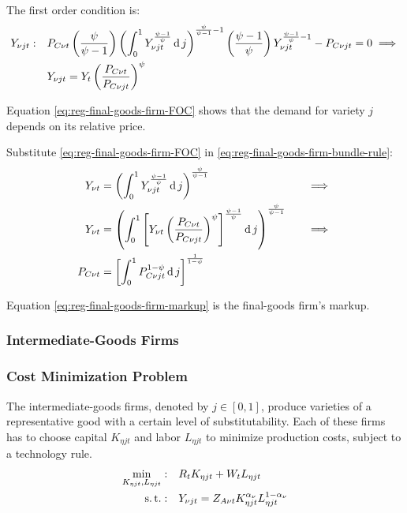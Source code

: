 \documentclass[
thesis.tex
]{subfiles}
\begin{document}
The first order condition is:
\begin{align}
	Y_{\nu jt}:\quad & P_{C\nu t} \left( \frac{\psi}{\psi-1} \right) \left( \int_{0}^{1} Y_{\nu jt}^{\frac{\psi-1}{\psi}} \operatorname{d} j \right)^{\frac{\psi}{\psi-1}-1} \left( \frac{\psi-1}{\psi} \right) Y_{\nu jt}^{\frac{\psi-1}{\psi}-1} - P_{C\nu jt} = 0 \implies \nonumber \\
	\label{eq:reg-final-goods-firm-FOC}
	& Y_{\nu jt} = Y_t \left( \frac{P_{C\nu t}}{P_{C\nu jt}} \right)^{\psi}
\end{align}

Equation \ref{eq:reg-final-goods-firm-FOC} shows that the demand for variety $j$ depends on its relative price. 

Substitute \ref{eq:reg-final-goods-firm-FOC} in \ref{eq:reg-final-goods-firm-bundle-rule}:
\begin{alignat}{2}
	Y_{\nu t} & = \left( \int_{0}^{1} Y_{\nu jt}^{\frac{\psi-1}{\psi}} \operatorname{d} j \right)^{\frac{\psi}{\psi-1}} &\implies \nonumber \\
	Y_{\nu t} & = \left( \int_{0}^{1} \left[ Y_{\nu t} \left( \frac{P_{C\nu t}}{P_{C\nu jt}} \right)^{\psi} \right]^{\frac{\psi-1}{\psi}} \operatorname{d} j \right)^{\frac{\psi}{\psi-1}} \quad &\implies \nonumber \\
	P_{C\nu t} & = \left[ \int_{0}^{1} P_{C\nu jt}^{1-\psi} \operatorname{d} j \right]^{\frac{1}{1-\psi}} \label{eq:reg-final-goods-firm-markup}
\end{alignat}

Equation \ref{eq:reg-final-goods-firm-markup} is the final-goods firm's markup.


\subsubsection{Intermediate-Goods Firms}

\subsubsection*{Cost Minimization Problem}

The intermediate-goods firms, denoted by $j \in [0,1]$, produce varieties of a representative good with a certain level of substitutability. Each of these firms has to choose capital $K_{\eta jt}$ and labor $L_{\eta jt}$ to minimize production costs, subject to a technology rule.
\begin{align}
	\label{eq:reg-int-good-firm-total-cost}
	\min_{K_{\eta jt}, L_{\eta jt}}: \quad & R_t K_{\eta jt} + W_t L_{\eta jt} \\
	\label{eq:reg-int-good-firm-production-function}
	\operatorname{s.t.}: \quad & Y_{\nu jt} = Z_{A\nu t} K_{\eta jt}^{\alpha_\nu} L_{\eta jt}^{1-{\alpha_\nu}}
\end{align}
\end{document}
